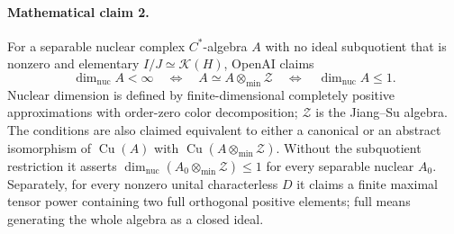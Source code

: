 \documentclass[11pt]{article}
\begin{document}
\paragraph{Mathematical claim 2.} For a separable nuclear complex $C^*$-algebra $A$ with no ideal subquotient that is nonzero and elementary $I/J\simeq\mathcal K(H)$, OpenAI claims
\[
\dim_{\mathrm{nuc}}A<\infty\quad\Longleftrightarrow\quad
A\simeq A\otimes_{\min}\mathcal Z\quad\Longleftrightarrow\quad\dim_{\mathrm{nuc}}A\le1.
\]
Nuclear dimension is defined by finite-dimensional completely positive approximations with order-zero color decomposition; $\mathcal Z$ is the Jiang--Su algebra. The conditions are also claimed equivalent to either a canonical or an abstract isomorphism of $\operatorname{Cu}(A)$ with $\operatorname{Cu}(A\otimes_{\min}\mathcal Z)$. Without the subquotient restriction it asserts $\dim_{\mathrm{nuc}}(A_0\otimes_{\min}\mathcal Z)\le1$ for every separable nuclear $A_0$. Separately, for every nonzero unital characterless $D$ it claims a finite maximal tensor power containing two full orthogonal positive elements; full means generating the whole algebra as a closed ideal.
\end{document}
